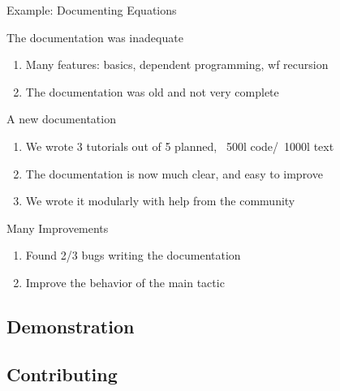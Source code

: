 \documentclass[10pt]{beamer}
\begin{document}
\begin{frame}{Example: Documenting Equations}
  \begin{tcbPbl}{The documentation was inadequate}
    \begin{enumerate}
      \item Many features: basics, dependent programming, wf recursion
      \item The documentation was old and not very complete
    \end{enumerate}
  \end{tcbPbl}
  \begin{tcbProp}{A new documentation}
    \begin{enumerate}
      \item We wrote 3 tutorials out of 5 planned, ~500l code/~1000l text
      \item The documentation is now much clear, and easy to improve
      \item We wrote it modularly with help from the community
    \end{enumerate}
    \end{tcbProp}
  \begin{tcbSol}{Many Improvements}
  \begin{enumerate}
    \item Found 2/3 bugs writing the documentation
    \item Improve the behavior of the main tactic
  \end{enumerate}
  \end{tcbSol}
\end{frame}

\subsection{Demonstration}



\subsection{Contributing}

\end{document}
